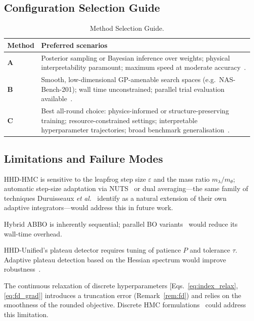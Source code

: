 \documentclass[11pt]{article}
\theoremstyle{definition}
\begin{document}
\subsection{Configuration Selection Guide}

\begin{table}[H]
\centering
\caption{Method Selection Guide.}
\label{tab:guide}
\renewcommand{\arraystretch}{1.35}
\begin{tabular}{p{1.6cm}p{5.8cm}}
\toprule
\textbf{Method} & \textbf{Preferred scenarios} \\
\midrule
\textbf{A} & Posterior sampling or Bayesian inference over
weights; physical interpretability paramount; maximum
speed at moderate accuracy~\cite{betancourt2017}. \\
\midrule
\textbf{B} & Smooth, low-dimensional GP-amenable search spaces
(e.g.~NAS-Bench-201); wall time unconstrained; parallel
trial evaluation available~\cite{snoek2012}. \\
\midrule
\textbf{C} & Best all-round choice: physics-informed or
structure-preserving training; resource-constrained
settings; interpretable hyperparameter trajectories;
broad benchmark generalisation~\cite{kiyani2025}. \\
\bottomrule
\end{tabular}
\end{table}

\subsection{Limitations and Failure Modes}

HHD-HMC is sensitive to the leapfrog step size $\varepsilon$ and the
mass ratio $m_\lambda/m_\theta$; automatic step-size adaptation via
NUTS~\cite{hoffman2014nuts} or dual averaging---the same family of
techniques Duruisseaux \emph{et al.}~\cite{duruisseaux2021adaptive}
identify as a natural extension of their own adaptive
integrators---would address this in future work.

Hybrid ABBO is inherently sequential; parallel BO
variants~\cite{shahriari2016bo} would reduce its wall-time overhead.

HHD-Unified's plateau detector requires tuning of patience $P$ and
tolerance $\tau$. Adaptive plateau detection based on the Hessian
spectrum would improve robustness~\cite{rathore2024,dobson2025connections}.

The continuous relaxation of discrete hyperparameters
[Eqs.~\eqref{eq:index_relax}, \eqref{eq:fd_grad}] introduces a
truncation error (Remark~\ref{rem:fd}) and relies on the smoothness
of the rounded objective. Discrete HMC formulations~\cite{neal2011}
could address this limitation.
\end{document}
